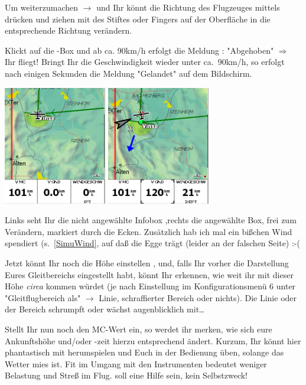 Um weiterzumachen $\rightarrow$ \dklick und Ihr könnt die Richtung des Flugzeuges mittels drücken und ziehen mit des Stiftes oder Fingers auf der Oberfläche in die entsprechende Richtung verändern.

Klickt auf die -Box und ab ca. 90km/h erfolgt die Meldung : "Abgehoben" $\Longrightarrow$ Ihr fliegt! Bringt Ihr die Geschwindigkeit wieder unter ca.\ 90km/h, so erfolgt nach einigen Sekunden die Meldung "Gelandet" auf dem Bildschirm.
\begin{center}
\includegraphics[width=4.5cm]{Bilder/SimInfoBoxNaktiv.png}%
\qquad
\includegraphics[width=4.5cm]{Bilder/SimInfoBoxAktiv.png}%
\end{center}
Links seht Ihr die nicht angewählte Infobox ,rechts die angewählte Box, frei zum Verändern, markiert durch die Ecken.  Zusätzlich hab ich mal ein bißchen Wind spendiert (s.~\ref{SimuWind}, auf daß die Egge trägt (leider an der falschen Seite)  :-(

Jetzt könnt Ihr noch die Höhe einstellen , und, falls Ihr vorher die Darstellung Eures Gleitbereichs eingestellt habt, könnt Ihr erkennen,
wie weit ihr mit dieser Höhe \textit{circa} kommen würdet (je nach Einstellung im Konfigurationsmenü 6 unter
"Gleitflugbereich als" $\rightarrow$ Linie, schraffierter Bereich oder nichts). Die Linie oder der Bereich schrumpft oder wächst augenblicklich mit\dots

Stellt Ihr nun noch den MC-Wert ein, so werdet ihr merken, wie sich eure Ankunftshöhe und/oder -zeit hierzu entsprechend ändert. Kurzum, Ihr könnt hier phantastisch mit herumspielen und Euch in der Bedienung üben, solange das Wetter mies ist. Fit im Umgang mit den Instrumenten bedeutet weniger Belastung und Streß im Flug. \xc soll eine Hilfe sein, kein Selbstzweck!

